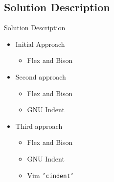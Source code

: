 \documentclass[compress]{beamer}
\begin{document}
\subsection{Solution Description}

\begin{frame}{Solution Description}
\begin{itemize}
    \item{Initial Approach}
        \begin{itemize}
            \item{Flex and Bison} 
        \end{itemize}
     
     \item{Second approach}
     \begin{itemize}
        \item{Flex and Bison}
        \item{GNU Indent}
     \end{itemize}

    \item{Third approach}
        \begin{itemize}
                \item{Flex and Bison}
        \item{GNU Indent}
        \item{Vim \texttt{'cindent'}}
        \end{itemize}
\end{itemize} 
\end{frame}
\end{document}
